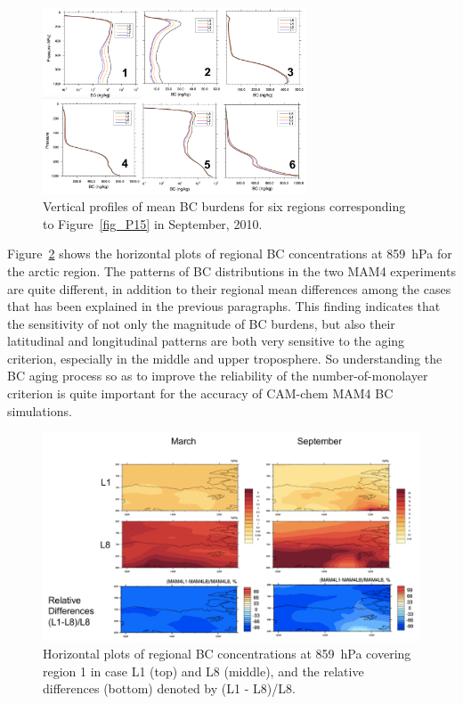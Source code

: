 \documentclass[12pt, fullpage]{uiucthesis2009}
\begin{document}
	
	\begin{figure}[h] 
		\begin{center}
			\includegraphics[width = 0.7\textwidth]{Figure16}
			\caption[Vertical profiles of mean BC burdens for six regions corresponding to Figure~\ref{fig_P15} in September, 2010]{\label{fig_P16} Vertical profiles of mean BC burdens for six regions corresponding to Figure~\ref{fig_P15} in September, 2010.}
		\end{center}
	\end{figure}
	
	
	Figure~\ref{fig_P20} shows the horizontal plots of regional BC concentrations at 859~hPa for the arctic region. The patterns of BC distributions in the two MAM4 experiments are quite different, in addition to their regional mean differences among the cases that has been explained in the previous paragraphs. This finding indicates that the sensitivity of not only the magnitude of BC burdens, but also their latitudinal and longitudinal patterns are both very sensitive to the aging criterion, especially in the middle and upper troposphere. So understanding the BC aging process so as to improve the reliability of the number-of-monolayer criterion is quite important for the accuracy of CAM-chem MAM4 BC simulations.
	
	
	\begin{figure}[h] 
		\begin{center}
			\includegraphics[width = 1\textwidth]{Figure20}
			\caption[Horizontal plots of regional BC concentrations at 859~hPa covering region 1 in case L1 (top) and L8 (middle), and the relative differences (bottom) denoted by (L1 - L8)/L8]{\label{fig_P20} Horizontal plots of regional BC concentrations at 859~hPa covering region 1 in case L1 (top) and L8 (middle), and the relative differences (bottom) denoted by (L1 - L8)/L8.}
		\end{center}
	\end{figure}
	
\end{document}
